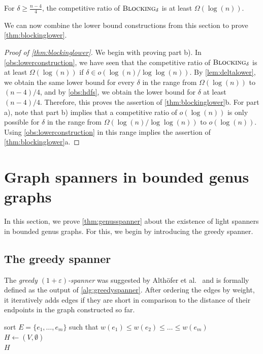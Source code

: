 \documentclass[a4paper,cleveref, autoref, thm-restate, thm-restate, UKenglish]{lipics-v2021}
\newcommand{\dist}{d}
\newcommand{\blocking}{\textsc{Blocking}}
\renewcommand{\epsilon}{\varepsilon}
\begin{document}
\begin{observation}\label{obs:hdfs}
For $\delta \geq  \frac{n-4}{4}$, the competitive ratio of $\blocking_\delta$ is at least $\Omega(\log (n))$.
\end{observation}

We can now combine the lower bound constructions from this section to 
 prove \hbox{\cref{thm:blockinglower}}.

\begin{proof}[Proof of \cref{thm:blockinglower}]
We begin with proving part b). In \cref{obs:lowerconstruction}, we have seen that the competitive ratio of $\blocking_\delta$ is at least $\Omega(\log (n))$ if $\delta \in o(\log (n)/\log \log (n))$. By \cref{lem:deltalower}, we obtain the same lower bound for every $\delta$ in the range from $\Omega(\log (n))$ to $(n-4)/4$, and by \cref{obs:hdfs}, we obtain the lower bound for $\delta$ at least $(n-4)/4$. Therefore, this proves the assertion of  \cref{thm:blockinglower}b. For part a), note that part b) implies that a competitive ratio of $o(\log (n))$ is only possible for $\delta$ in the range from $\Omega(\log (n)/\log \log (n))$ to $o(\log (n))$. Using \cref{obs:lowerconstruction} in this range implies the assertion of \cref{thm:blockinglower}a.
\end{proof}


\section{Graph spanners in bounded genus graphs}

In this section, we prove \cref{thm:genusspanner} about the existence of light spanners in bounded genus graphs. For this, we begin by introducing the greedy spanner.


\subsection{The greedy spanner}

The \emph{greedy $(1+\epsilon)$-spanner} was suggested by Althöfer et al.~\cite{althoefer} and is formally defined as the output of \cref{alg:greedyspanner}. After ordering the edges by weight, it iteratively adds edges if they are short in comparison to the distance of their endpoints in the graph constructed so far.
\begin{algorithm}
\caption{\textsc{GreedySpanner}($G=(V,E, w)$, $\epsilon$)}\label{alg:greedyspanner}
sort $E=\{e_1, \dots, e_m \}$ such that $w(e_1)\leq w(e_2) \leq \dots \leq w(e_m)$\\
$H\gets (V,\emptyset)$\\
\For{ $i \leftarrow 1 , \dots , m$}{
\If{$\dist_H(u_i,v_i)>(1+\epsilon)w(e_i)$, where $e_i=(u_i,v_i)$}{$H\gets H\cup \{e_i\}$}
}
\Return $H$
\end{algorithm}
\end{document}
